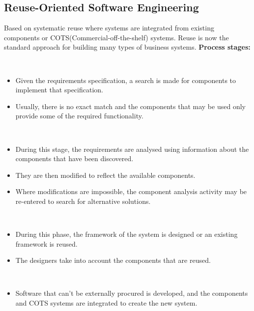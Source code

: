 \documentclass{report}
\begin{document}
\subsection{Reuse-Oriented Software Engineering}
Based on systematic reuse where systems are integrated from existing components or COTS(Commercial-off-the-shelf) systems. Reuse is now the standard approach for building many types of business systems.\newline
\textbf{Process stages:}
\begin{description}
  \setlength\itemsep{-.25em}
  \item [Component analysis] \
  \begin{itemize}
    \setlength\itemsep{-.25em}
    \item Given the requirements specification, a search is made for components to implement that specification.
    \item Usually, there is no exact match and the components that may be used only provide some of the required functionality.
  \end{itemize}
  \item[Requirements modification] \
  \begin{itemize}
  \setlength\itemsep{-.25em}
  \item During this stage, the requirements are analysed using information about the components that have been discovered.
  \item They are then modified to reflect the available components.
  \item Where modifications are impossible, the component analysis activity may be re-entered to search for alternative solutions.
  \end{itemize}
  \item [System design with reuse] \
  \begin{itemize}
  \setlength\itemsep{-.25em}
  \item During this phase, the framework of the system is designed or an existing framework is reused.
  \item The designers take into account the components that are reused.
  \end{itemize}
  \item [Development and integration.] \
  \begin{itemize}
  \setlength\itemsep{-.25em}
   \item Software that can’t be externally procured is developed, and the components and COTS systems are integrated to create the new system.
  \end{itemize}
\end{description}
\end{document}
